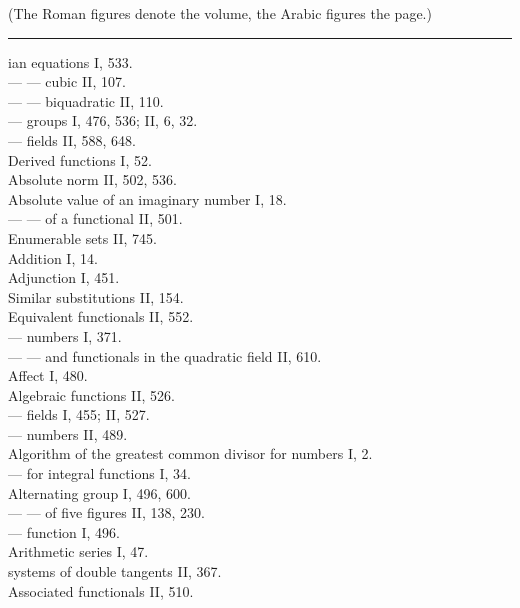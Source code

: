 \begin{center}
\end{center}

\begin{center}
(The Roman figures denote the volume, the Arabic figures the page.)
\end{center}

\begin{center}
\rule{3cm}{0.5pt}
\end{center}

\noindent
{}ian equations I, 533.\\
--- --- cubic II, 107.\\
--- --- biquadratic II, 110.\\
--- groups I, 476, 536; II, 6, 32.\\
--- fields II, 588, 648.\\
Derived functions I, 52.\\
Absolute norm II, 502, 536.\\
Absolute value of an imaginary number I, 18.\\
--- --- of a functional II, 501.\\
Enumerable sets II, 745.\\
Addition I, 14.\\
Adjunction I, 451.\\
Similar substitutions II, 154.\\
Equivalent functionals II, 552.\\
--- numbers I, 371.\\
--- --- and functionals in the quadratic field II, 610.\\
Affect I, 480.\\
Algebraic functions II, 526.\\
--- fields I, 455; II, 527.\\
--- numbers II, 489.\\
Algorithm of the greatest common divisor for numbers I, 2.\\
--- for integral functions I, 34.\\
Alternating group I, 496, 600.\\
--- --- of five figures II, 138, 230.\\
--- function I, 496.\\
Arithmetic series I, 47.\\
 systems of double tangents II, 367.\\
Associated functionals II, 510.\\

